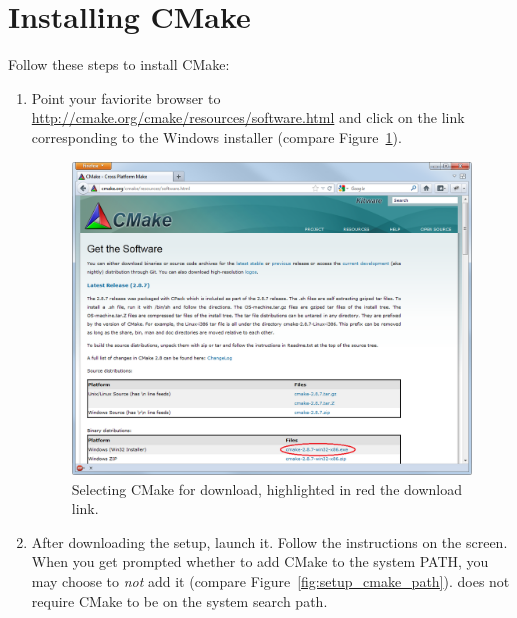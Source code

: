 %
% 
%
%
%
%

\section{Installing CMake}
\label{appx:install_cmake}

Follow these steps to install CMake:

\begin{enumerate}
	\item Point your faviorite browser to \url{http://cmake.org/cmake/resources/software.html}
		and click on the link corresponding to the Windows installer
		(compare Figure~\ref{fig:setup_cmake_download}).

\begin{figure}[htbp]
	\centering
	\includegraphics[scale=0.4]{figures/PNG/setup_cmake_download_edited.png}
	\caption{Selecting CMake for download, highlighted in red the download link.}
	\label{fig:setup_cmake_download}
\end{figure}

	\item After downloading the setup, launch it. Follow the instructions on the screen.
		When you get prompted whether to add CMake to the system PATH, you may choose to \emph{not} add it
		(compare Figure~\ref{fig:setup_cmake_path}).
		\xme does not require CMake to be on the system search path.


\end{enumerate}
